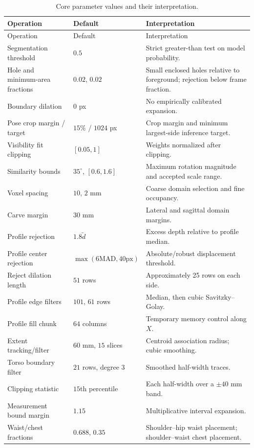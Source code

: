 \documentclass[11pt,a4paper]{article}
\numberwithin{equation}{section}
\begin{document}
\begin{longtable}{L{4.7cm}L{3.3cm}L{6.7cm}}
\caption{Core parameter values and their interpretation.}\label{tab:parameters}\\
\toprule
Operation & Default & Interpretation \\
\midrule
\endfirsthead
\toprule Operation & Default & Interpretation \\
\midrule
\endhead
\bottomrule\endfoot
Segmentation threshold & $0.5$ & Strict greater-than test on model probability. \\
Hole and minimum-area fractions & $0.02$, $0.02$ & Small enclosed holes relative to foreground; rejection below frame fraction. \\
Boundary dilation & $0$ px & No empirically calibrated expansion. \\
Pose crop margin / target & $15\%$ / $1024$ px & Crop margin and minimum largest-side inference target. \\
Visibility fit clipping & $[0.05,1]$ & Weights normalized after clipping. \\
Similarity bounds & $35^\circ$, $[0.6,1.6]$ & Maximum rotation magnitude and accepted scale range. \\
Voxel spacing & $10$, $2$ mm & Coarse domain selection and fine occupancy. \\
Carve margin & $30$ mm & Lateral and sagittal domain margins. \\
Profile rejection & $1.8\widetilde d$ & Excess depth relative to profile median. \\
Profile center rejection & $\max(6\mathrm{MAD},40\mathrm{px})$ & Absolute/robust displacement threshold. \\
Reject dilation length & $51$ rows & Approximately 25 rows on each side. \\
Profile edge filters & $101$, $61$ rows & Median, then cubic Savitzky--Golay. \\
Profile fill chunk & $64$ columns & Temporary memory control along $X$. \\
Extent tracking/filter & $60$ mm, $15$ slices & Centroid association radius; cubic smoothing. \\
Torso boundary filter & $21$ rows, degree 3 & Smoothed half-width traces. \\
Clipping statistic & $15$th percentile & Each half-width over a $\pm40$ mm band. \\
Measurement bound margin & $1.15$ & Multiplicative interval expansion. \\
Waist/chest fractions & $0.688$, $0.35$ & Shoulder--hip waist placement; shoulder--waist chest placement. \\

\end{longtable}
\end{document}
